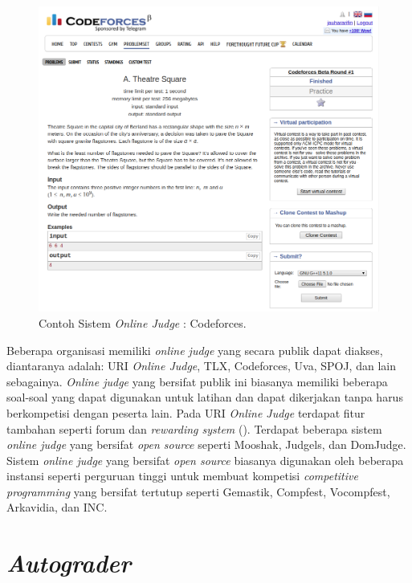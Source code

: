 \begin{figure}[ht]
	\centering
	\includegraphics[width=\textwidth]{images/codeforces}
	\caption{Contoh Sistem \textit{Online Judge} : Codeforces.}
	\label{fig:codeforces}
\end{figure}

\par Beberapa organisasi memiliki \textit{online judge} yang secara publik dapat diakses, diantaranya adalah: URI \textit{Online Judge}, TLX, Codeforces, Uva, SPOJ, dan lain sebagainya. \textit{Online judge} yang bersifat publik ini biasanya memiliki beberapa soal-soal yang dapat digunakan untuk latihan dan dapat dikerjakan tanpa harus berkompetisi dengan peserta lain. Pada URI \textit{Online Judge} terdapat fitur tambahan seperti forum dan \textit{rewarding system} (\cite{uriojpaper}). Terdapat beberapa sistem \textit{online judge} yang bersifat \textit{open source} seperti Mooshak, Judgels, dan DomJudge. Sistem \textit{online judge} yang bersifat \textit{open source} biasanya digunakan oleh beberapa instansi seperti perguruan tinggi untuk membuat kompetisi \textit{competitive programming} yang bersifat tertutup seperti Gemastik, Compfest, Vocompfest, Arkavidia, dan INC.

\section{\textit{Autograder}}

